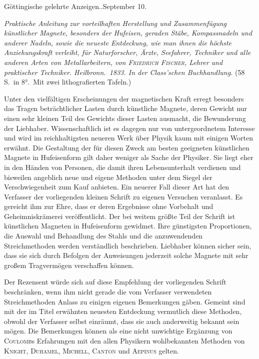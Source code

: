 \vspace{6mm}
\begin{center}\small Göttingische gelehrte Anzeigen..\quad September 10.\end{center}

\textit{Praktische Anleitung zur vorteilhaften Herstellung und Zusammenfügung künstlicher Magnete, besonders der Hufeisen, geraden Stäbe, Kompassnadeln und anderer Nadeln, sowie die neueste Entdeckung, wie man ihnen die höchste Anziehungskraft verleiht, für Naturforscher, Ärzte, Seefahrer, Techniker und alle anderen Arten von Metallarbeitern, von \textup{\textsc{Friedrich Fischer}}, Lehrer und praktischer Techniker. Heilbronn.\ \textup{1833.} In der Class’schen Buchhandlung.} (58 S.\ in 8°.\ Mit zwei lithografierten Tafeln.)

Unter den vielfältigen Erscheinungen der magnetischen Kraft erregt besonders das Tragen beträchtlicher Lasten durch künstliche Magnete, deren Gewicht nur einen sehr kleinen Teil des Gewichts dieser Lasten ausmacht, die Bewunderung der Liebhaber. Wissenschaftlich ist es dagegen nur von untergeordnetem Interesse und wird im reichhaltigsten neueren Werk über Physik kaum mit einigen Worten erwähnt. Die Gestaltung der für diesen Zweck am besten geeigneten künstlichen Magnete in Hufeisenform gilt daher weniger als Sache der Physiker. Sie liegt eher in den Händen von Personen, die damit ihren Lebensunterhalt verdienen und bisweilen angeblich neue und eigene Methoden unter dem Siegel der Verschwiegenheit zum Kauf anbieten. Ein neuerer Fall dieser Art hat den Verfasser der vorliegenden kleinen Schrift zu eigenen Versuchen veranlasst. Es gereicht ihm zur Ehre, dass er deren Ergebnisse ohne Vorbehalt und Geheimniskrämerei veröffentlicht. Der bei weitem größte Teil der Schrift ist künstlichen Magneten in Hufeisenform gewidmet. Ihre günstigsten Proportionen, die Auswahl und Behandlung des Stahls und die anzuwendenden Streichmethoden werden verständlich beschrieben. Liebhaber können sicher sein, dass sie sich durch Befolgen der Anweisungen jederzeit solche Magnete mit sehr großem Tragvermögen verschaffen können.

Der Rezensent würde sich auf diese Empfehlung der vorliegenden Schrift beschränken, wenn ihm nicht gerade die vom Verfasser verwendeten Streichmethoden Anlass zu einigen eigenen Bemerkungen gäben. Gemeint sind mit der im Titel erwähnten neuesten Entdeckung vermutlich diese Methoden, obwohl der Verfasser selbst einräumt, dass sie auch anderweitig bekannt sein mögen. Die Bemerkungen können als eine nicht unwichtige Ergänzung von \textsc{Coulomb}s Erfahrungen mit den allen Physikern wohlbekannten Methoden von \textsc{Knight}, \textsc{Duhamel}, \textsc{Michell}, \textsc{Canton} und \textsc{Aepinus} gelten.

